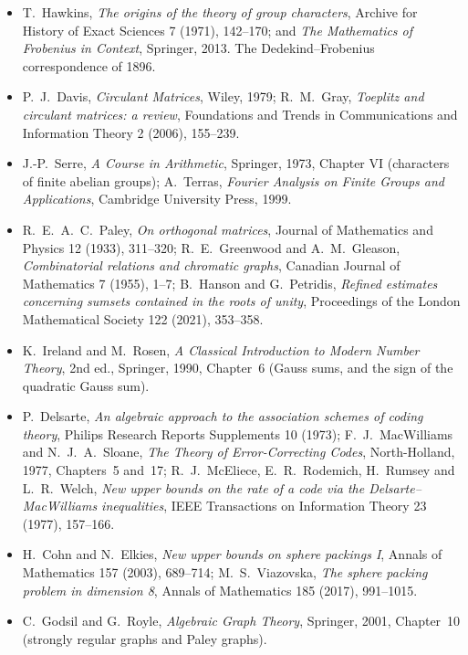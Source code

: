 \begin{itemize}
\item T.~Hawkins, \emph{The origins of the theory of group characters}, Archive for History of Exact Sciences 7 (1971), 142--170; and
\emph{The Mathematics of Frobenius in Context}, Springer, 2013. The Dedekind--Frobenius correspondence of 1896.
\item P.~J.~Davis, \emph{Circulant Matrices}, Wiley, 1979; R.~M.~Gray, \emph{Toeplitz and circulant matrices: a review}, Foundations and
Trends in Communications and Information Theory 2 (2006), 155--239.
\item J.-P.~Serre, \emph{A Course in Arithmetic}, Springer, 1973, Chapter VI (characters of finite abelian groups); A.~Terras,
\emph{Fourier Analysis on Finite Groups and Applications}, Cambridge University Press, 1999.
\item R.~E.~A.~C.~Paley, \emph{On orthogonal matrices}, Journal of Mathematics and Physics 12 (1933), 311--320; R.~E.~Greenwood and
A.~M.~Gleason, \emph{Combinatorial relations and chromatic graphs}, Canadian Journal of Mathematics 7 (1955), 1--7; B.~Hanson and
G.~Petridis, \emph{Refined estimates concerning sumsets contained in the roots of unity}, Proceedings of the London Mathematical
Society 122 (2021), 353--358.
\item K.~Ireland and M.~Rosen, \emph{A Classical Introduction to Modern Number Theory}, 2nd ed., Springer, 1990, Chapter~6 (Gauss sums,
and the sign of the quadratic Gauss sum).
\item P.~Delsarte, \emph{An algebraic approach to the association schemes of coding theory}, Philips Research Reports Supplements 10
(1973); F.~J.~MacWilliams and N.~J.~A.~Sloane, \emph{The Theory of Error-Correcting Codes}, North-Holland, 1977, Chapters~5 and~17;
R.~J.~McEliece, E.~R.~Rodemich, H.~Rumsey and L.~R.~Welch, \emph{New upper bounds on the rate of a code via the Delsarte--MacWilliams
inequalities}, IEEE Transactions on Information Theory 23 (1977), 157--166.
\item H.~Cohn and N.~Elkies, \emph{New upper bounds on sphere packings I}, Annals of Mathematics 157 (2003), 689--714; M.~S.~Viazovska,
\emph{The sphere packing problem in dimension 8}, Annals of Mathematics 185 (2017), 991--1015.
\item C.~Godsil and G.~Royle, \emph{Algebraic Graph Theory}, Springer, 2001, Chapter~10 (strongly regular graphs and Paley graphs).
\end{itemize}
